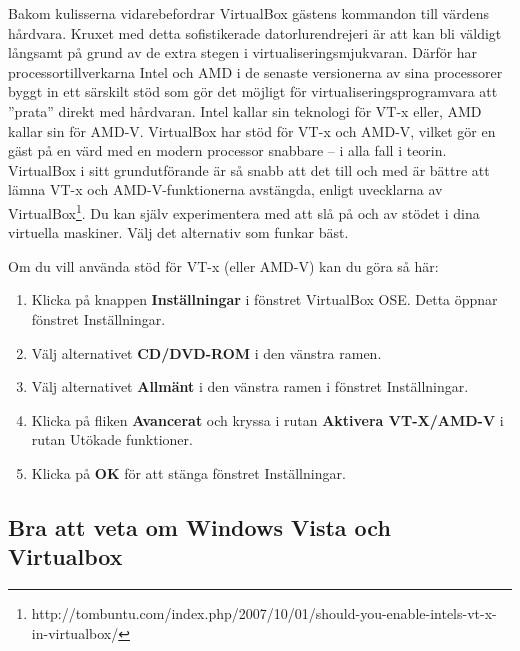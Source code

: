 \documentclass[a4paper,final]{memoir} %
\begin{document}

Bakom kulisserna vidarebefordrar VirtualBox gästens kommandon till värdens hårdvara. Kruxet med detta sofistikerade datorlurendrejeri är att kan bli väldigt långsamt på grund av de extra stegen i virtualiseringsmjukvaran. Därför har processortillverkarna Intel och AMD i de senaste versionerna av sina processorer byggt in ett särskilt stöd som gör det möjligt för virtualiseringsprogramvara att ''prata'' direkt med hårdvaran. Intel kallar sin teknologi för VT-x eller, AMD kallar sin för AMD-V. VirtualBox har stöd för VT-x och AMD-V, vilket gör en gäst på en värd med en modern processor snabbare -- i alla fall i teorin. VirtualBox i sitt grundutförande är så snabb att det till och med är bättre att lämna VT-x och AMD-V-funktionerna avstängda, enligt uvecklarna av VirtualBox\footnote{http://tombuntu.com/index.php/2007/10/01/should-you-enable-intels-vt-x-in-virtualbox/}. Du kan själv experimentera med att slå på och av stödet i dina virtuella maskiner. Välj det alternativ som funkar bäst.

Om du vill använda stöd för VT-x (eller AMD-V) kan du göra så här:

\begin{enumerate}

\item Klicka på knappen \textbf{Inställningar} i fönstret VirtualBox OSE. Detta öppnar fönstret Inställningar.

\item Välj alternativet \textbf{CD/DVD-ROM} i den vänstra ramen.

\item Välj alternativet \textbf{Allmänt} i den vänstra ramen i fönstret Inställningar. 

\item Klicka på fliken \textbf{Avancerat} och kryssa i rutan \textbf{Aktivera VT-X/AMD-V} i rutan Utökade funktioner. 

\item Klicka på \textbf{OK} för att stänga fönstret Inställningar.

\end{enumerate}


\subsection{Bra att veta om Windows Vista och Virtualbox}
\end{document}
